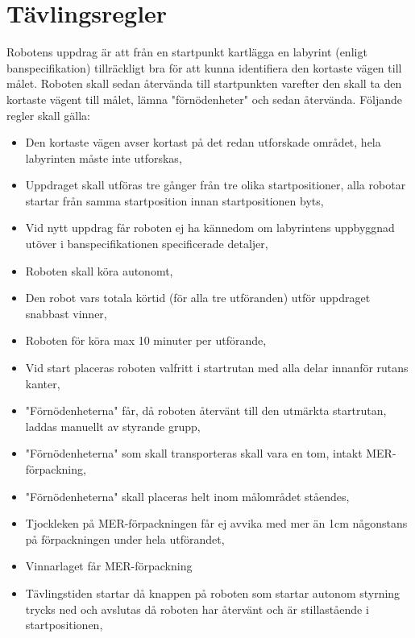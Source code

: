 \documentclass{article}
\begin{document}
\section{Tävlingsregler}
Robotens uppdrag är att från en startpunkt kartlägga en labyrint (enligt banspecifikation) tillräckligt bra för att kunna identifiera den kortaste vägen till målet. Roboten skall sedan återvända till startpunkten varefter den skall ta den kortaste vägent till målet, lämna "förnödenheter"  och sedan återvända. 
Följande regler skall gälla:
\begin{itemize}
\item Den kortaste vägen avser kortast på det redan utforskade området, hela labyrinten måste inte utforskas,
\item Uppdraget skall utföras tre gånger från tre olika startpositioner, alla robotar startar från samma startposition innan startpositionen byts,
\item Vid nytt uppdrag får roboten ej ha kännedom om labyrintens uppbyggnad utöver i banspecifikationen specificerade detaljer,
\item Roboten skall köra autonomt, 
\item Den robot vars totala körtid (för alla tre utföranden) utför uppdraget snabbast vinner, 
\item Roboten för köra max 10 minuter per utförande, 
\item Vid start placeras roboten valfritt i startrutan med alla delar innanför rutans kanter,
\item "Förnödenheterna" får, då roboten återvänt till den utmärkta startrutan, laddas manuellt av styrande grupp,
\item "Förnödenheterna" som skall transporteras skall vara en tom, intakt MER-förpackning,
\item "Förnödenheterna" skall placeras helt inom målområdet ståendes, 
\item Tjockleken på MER-förpackningen får ej avvika med mer än 1cm någonstans på förpackningen under hela utförandet, 
\item Vinnarlaget får MER-förpackning
\item Tävlingstiden startar då knappen på roboten som startar autonom styrning trycks ned och avslutas då roboten har återvänt och är stillastående i startpositionen,

\end{itemize}
\end{document}
